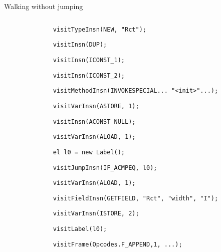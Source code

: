 \begin{frame}{Walking without jumping}
\begin{columns}[T]
\begin{column}{0.35\textwidth}
\begin{overprint}
\begin{drawstack}
        \end{drawstack}
        \begin{drawstack}
        \end{drawstack}
        \begin{drawstack}
        \end{drawstack}
      \end{overprint}
    \end{column}
    \begin{column}{0.60\textwidth}
      \small
      \setlength{\leftmargin}{0pt}
      \setlength{\leftmargini}{0pt}
      \lstset{columns=fullflexible}
      \begin{itemizeStepWithAlert}
        \setlength{\itemsep}{0pt}
        \setlength{\parskip}{0pt}
        \setlength{\parsep}{0pt}
      \item[] %
        \lstinline{visitTypeInsn(NEW, "Rct");}
      \item[] %
        \lstinline{visitInsn(DUP);}
      \item[] %
        \lstinline{visitInsn(ICONST_1);}
      \item[] %
        \lstinline{visitInsn(ICONST_2);}
      \item[] %
        \lstinline{visitMethodInsn(INVOKESPECIAL... "<init>"...);}
      \item[] %
        \lstinline{visitVarInsn(ASTORE, 1);}
      \item[] %
        \lstinline{visitInsn(ACONST_NULL);}
      \item[] %
        \lstinline{visitVarInsn(ALOAD, 1);}
      \item[] %
        \lstinline{el l0 = new Label();}
      \item[] %
        \lstinline{visitJumpInsn(IF_ACMPEQ, l0);}
      \item[] %
        \lstinline{visitVarInsn(ALOAD, 1);}
      \item[] %
        \lstinline{visitFieldInsn(GETFIELD, "Rct", "width", "I");}
      \item[] %
        \lstinline{visitVarInsn(ISTORE, 2);}
      \item[] %
        \lstinline{visitLabel(l0);}
      \item[] %
        \lstinline{visitFrame(Opcodes.F_APPEND,1, ...);}
      \end{itemizeStepWithAlert}
    \end{column}
  \end{columns}
\end{frame}

